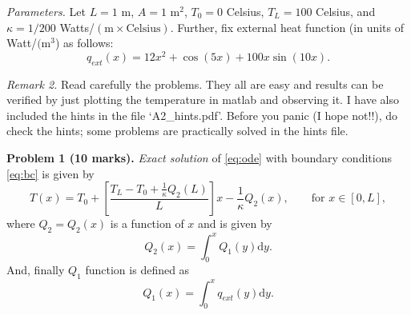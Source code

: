\documentclass[11pt,a4paper]{report}
\newcommand{\dd}{\mathrm{d}}
\begin{document}
\vspace{10pt}
\noindent\textit{Parameters.} Let $L = 1$ m, $A = 1$ m$^2$, $T_0 = 0$ Celsius, $T_L = 100$ Celsius, and $\kappa = 1/200$ Watts/$(\text{m} \times \text{Celsius})$. Further, fix external heat function (in units of Watt/$(\text{m}^3$) as follows:
\begin{equation}\label{eq:qext}
q_{ext}(x) = 12x^2 + \cos(5x) + 100x \sin(10x).
\end{equation}

\vspace{10pt}
\noindent\textit{Remark 2.} Read carefully the problems. They all are easy and results can be verified by just plotting the temperature in matlab and observing it. I have also included the hints in the file `A2\_hints.pdf'. Before you panic (I hope not!!), do check the hints; some problems are practically solved in the hints file.   

\vspace{10pt}
\noindent\textbf{Problem 1 (10 marks).} \textit{Exact solution} of \eqref{eq:ode} with boundary conditions \eqref{eq:bc} is given by
\begin{equation}
T(x) = T_0 + \left[ \frac{T_L - T_0 + \frac{1}{\kappa} Q_2(L)}{L} \right] x - \frac{1}{\kappa} Q_2(x), \qquad \text{for } x \in [0, L],
\end{equation}
where $Q_2 = Q_2(x)$ is a function of $x$ and is given by
\begin{equation}
Q_2(x) = \int_{0}^x Q_1(y) \dd y.
\end{equation}
And, finally $Q_1$ function is defined as
\begin{equation}
Q_1(x) = \int_0^x q_{ext}(y) \dd y.
\end{equation}
\end{document}
